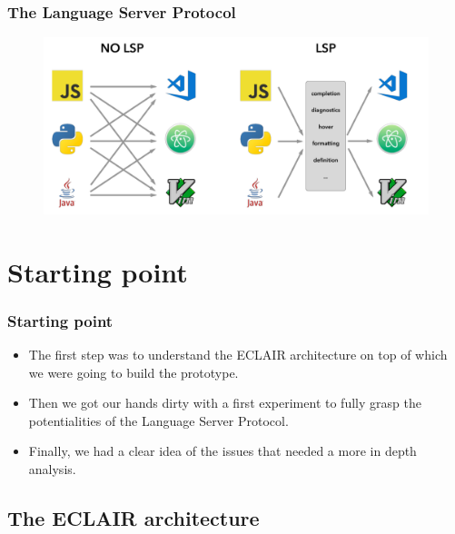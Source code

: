 \documentclass[compress,xcolor={dvipsnames}]{beamer}
\begin{document}
\begin{frame}
  \frametitle{The Language Server Protocol}
  \large

  \begin{figure}[ht]
    \centering
    \includegraphics[width=1.0\textwidth]{./language-server-protocol.png}
    \label{fig:one}
  \end{figure}
\end{frame}

\section{Starting point}

\begin{frame}
  \frametitle{Starting point}

  \begin{itemize}
    \setlength\itemsep{2em}
     \item
      The first step was to understand the ECLAIR architecture on top of which we were going to build the prototype.

    \item
      Then we got our hands dirty with a first experiment to fully grasp the potentialities of the Language Server Protocol.
    
    \item
      Finally, we had a clear idea of the issues that needed a more in depth analysis.

  \end{itemize}
\end{frame}

\subsection{The ECLAIR architecture}
\end{document}
